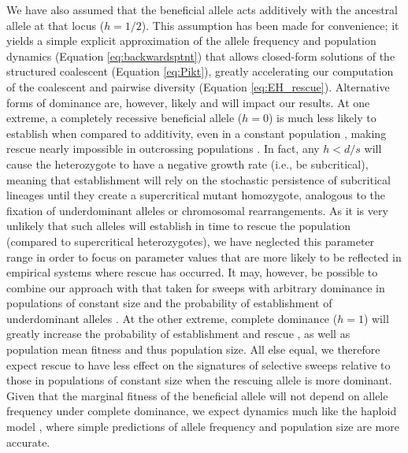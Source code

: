 \documentclass[]{article}
\begin{document}
We have also assumed that the beneficial allele acts additively with the ancestral allele at that locus ($h=1/2$).
This assumption has been made for convenience; it yields a simple explicit approximation of the allele frequency and population dynamics (Equation \ref{eq:backwardsptnt}) that allows closed-form solutions of the structured coalescent (Equation \ref{eq:Pikt}), greatly accelerating our computation of the coalescent and pairwise diversity (Equation \ref{eq:EH_rescue}).
Alternative forms of dominance are, however, likely and will impact our results.
At one extreme, a completely recessive beneficial allele ($h=0$) is much less likely to establish when compared to additivity, even in a constant population \citep[compare Equation \ref{eq:pest} with $v=1$ and $\epsilon=s/2$ to equation 15 in][]{kimura1962probability}, making rescue nearly impossible in outcrossing populations \citep{uecker2017evolutionary}.
In fact, any $h < d/s$ will cause the heterozygote to have a negative growth rate (i.e., be subcritical), meaning that establishment will rely on the stochastic persistence of subcritical lineages until they create a supercritical mutant homozygote, analogous to the fixation of underdominant alleles or chromosomal rearrangements.
As it is very unlikely that such alleles will establish in time to rescue the population (compared to supercritical heterozygotes), we have neglected this parameter range in order to focus on parameter values that are more likely to be reflected in empirical systems where rescue has occurred.
It may, however, be possible to combine our approach with that taken for sweeps with arbitrary dominance in populations of constant size \citep{ewing2011selective} and the probability of establishment of underdominant alleles \citep[e.g., equation 3 in][]{lande1979effective}.
At the other extreme, complete dominance ($h=1$) will greatly increase the probability of establishment and rescue \citep{uecker2017evolutionary}, as well as population mean fitness and thus population size.
All else equal, we therefore expect rescue to have less effect on the signatures of selective sweeps relative to those in populations of constant size when the rescuing allele is more dominant.
Given that the marginal fitness of the beneficial allele will not depend on allele frequency under complete dominance, we expect dynamics much like the haploid model \citep{orr2014population}, where simple predictions of allele frequency and population size are more accurate.
\end{document}
